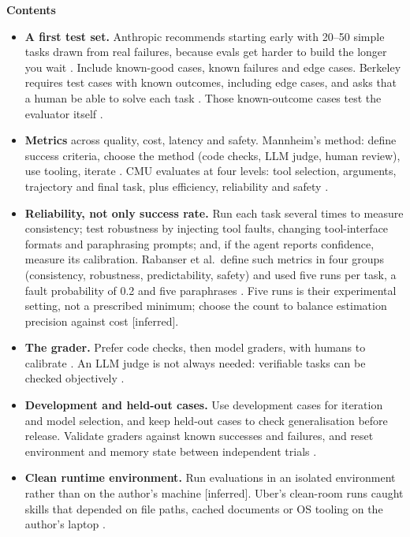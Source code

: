 \documentclass[10pt]{article}
\newcommand{\inferred}{\textsf{\small[inferred]}}
\begin{document}
\textbf{Contents}
\begin{itemize}
\item \textbf{A first test set.} Anthropic recommends starting early with 20--50 simple tasks drawn from real failures, because evals get harder to build the longer you wait \cite{anthevals}. Include known-good cases, known failures and edge cases. Berkeley requires test cases with known outcomes, including edge cases, and asks that a human be able to solve each task \cite[pp.~82--85, 91]{brkeval}. Those known-outcome cases test the evaluator itself \cite[p.~85]{brkeval}.
\item \textbf{Metrics} across quality, cost, latency and safety. Mannheim's method: define success criteria, choose the method (code checks, LLM judge, human review), use tooling, iterate \cite[p.~76]{mannheim4}. CMU evaluates at four levels: tool selection, arguments, trajectory and final task, plus efficiency, reliability and safety \cite[pp.~54--56]{cmu2}.
\item \textbf{Reliability, not only success rate.} Run each task several times to measure consistency; test robustness by injecting tool faults, changing tool-interface formats and paraphrasing prompts; and, if the agent reports confidence, measure its calibration. Rabanser et al.\ define such metrics in four groups (consistency, robustness, predictability, safety) and used five runs per task, a fault probability of 0.2 and five paraphrases \cite[\S3, Table~2; \S4.1]{reliab}. Five runs is their experimental setting, not a prescribed minimum; choose the count to balance estimation precision against cost \inferred.
\item \textbf{The grader.} Prefer code checks, then model graders, with humans to calibrate \cite{anthevals}. An LLM judge is not always needed: verifiable tasks can be checked objectively \cite[pp.~17, 71]{brkeval}.
\item \textbf{Development and held-out cases.} Use development cases for iteration and model selection, and keep held-out cases to check generalisation before release. Validate graders against known successes and failures, and reset environment and memory state between independent trials \cite[``Collaborating with agents'']{anthtools}\cite[steps~2, 4, 5]{anthevals}.
\item \textbf{Clean runtime environment.} Run evaluations in an isolated environment rather than on the author's machine \inferred. Uber's clean-room runs caught skills that depended on file paths, cached documents or OS tooling on the author's laptop \cite[``Evals'']{uberskills}.

\end{itemize}
\end{document}
